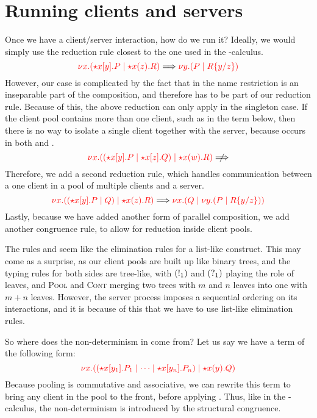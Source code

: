 \section{Running clients and servers}\label{sec:nc-running-clients-and-servers}
Once we have a client/server interaction, how do we run it? Ideally, we would
simply use the reduction rule closest to the one used in the \textpi-calculus. 
\[
  \reducesto
  {\tm{\cpCut{x}{\ncCnt{x}{y}{P}}{\ncSrv{x}{z}{R}}}}
  {\tm{\cpCut{y}{P}{\cpSub{y}{z}{R}}}}
\]
However, our case is complicated by the fact that in  the
name restriction is an inseparable part of the composition, and therefore has to
be part of our reduction rule. 
Because of this, the above reduction can only apply in the singleton case.
If the client pool contains more than one client, such as in the term below,
then there is no way to isolate a single client together with the server,
because  occurs in both  and .
\[
  \tm{\cpCut{x}{\ncPool{\ncCnt{x}{y}{P}}{\ncCnt{x}{z}{Q}}}{\ncSrv{x}{w}{R}}}
  \centernot\Longrightarrow
\]
Therefore, we add a second reduction rule, which handles communication between a
one client in a pool of multiple clients and a server.
\[
  \reducesto
  {\tm{\cpCut{x}{\ncPool{\ncCnt{x}{y}{P}}{Q}}{\ncSrv{x}{z}{R}}}}
  {\tm{\cpCut{x}{Q}{\cpCut{y}{P}{\cpSub{y}{z}{R}}}}}
\]
Lastly, because we have added another form of parallel composition, we add
another congruence rule, to allow for reduction inside client pools.


The rules  and  seem like the elimination
rules for a list-like construct. This may come as a surprise, as our client
pools are built up like binary trees, and the typing rules for both sides are
tree-like, with $(\take[1]{})$ and $(\give[1]{})$ playing the role of leaves,
and \textsc{Pool} and \textsc{Cont} merging two trees with $m$ and $n$ leaves
into one with $m+n$ leaves.
However, the server process imposes a sequential ordering on its interactions,
and it is because of this that we have to use list-like elimination rules.

So where does the non-determinism in \nodcap come from? Let us say we have a
term of the following form:
\[
  \tm{
    \cpCut{x}
    {\ncPool{\ncCnt{x}{y_1}{P_1}}{\dots \mid \ncCnt{x}{y_n}{P_n}}}
    {\ncSrv{x}{y}{Q}}
  }
\]
Because pooling is commutative and associative, we can rewrite this term to
bring any client in the pool to the front, before applying .
Thus, like in the \textpi-calculus, the non-determinism is introduced by the
structural congruence.

